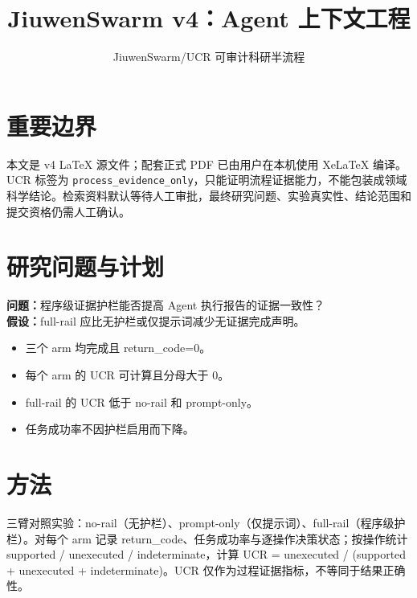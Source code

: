 \documentclass[UTF8]{ctexart}
\title{JiuwenSwarm v4：Agent 上下文工程}
\author{JiuwenSwarm/UCR 可审计科研半流程}
\date{}
\begin{document}
\maketitle
\section{重要边界}
本文是 v4 LaTeX 源文件；配套正式 PDF 已由用户在本机使用 XeLaTeX 编译。UCR 标签为 \texttt{process\_evidence\_only}，只能证明流程证据能力，不能包装成领域科学结论。检索资料默认等待人工审批，最终研究问题、实验真实性、结论范围和提交资格仍需人工确认。
\section{研究问题与计划}
\textbf{问题：}程序级证据护栏能否提高 Agent 执行报告的证据一致性？\\
\textbf{假设：}full-\allowbreak{}rail 应比无护栏或仅提示词减少无证据完成声明。
\begin{itemize}
\item 三个 arm 均完成且 return\_\allowbreak{}code=0。
\item 每个 arm 的 UCR 可计算且分母大于 0。
\item full-\allowbreak{}rail 的 UCR 低于 no-\allowbreak{}rail 和 prompt-\allowbreak{}only。
\item 任务成功率不因护栏启用而下降。
\end{itemize}
\section{方法}
三臂对照实验：no-\allowbreak{}rail（无护栏）、prompt-\allowbreak{}only（仅提示词）、full-\allowbreak{}rail（程序级护栏）。对每个 arm 记录 return\_\allowbreak{}code、任务成功率与逐操作决策状态；按操作统计 supported  /  unexecuted  /  indeterminate，计算 UCR = unexecuted  /  (supported + unexecuted + indeterminate)。UCR 仅作为过程证据指标，不等同于结果正确性。
\end{document}
